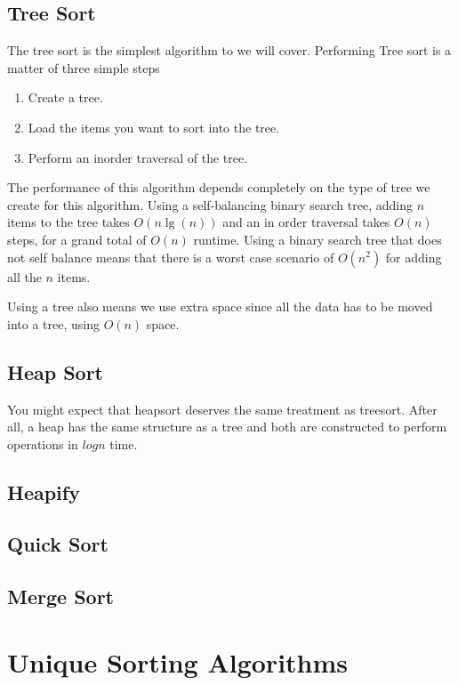 \documentclass[10pt,a4paper]{book}
\begin{document}
\subsection{Tree Sort}
The tree sort is the simplest algorithm to we will cover. Performing Tree sort is a matter of three simple steps

\begin{enumerate}
	\item Create a tree.
	\item Load the items you want to sort into the tree.
	\item Perform an inorder traversal of the tree.
\end{enumerate}


The performance of this algorithm depends completely on the type of tree we create for this algorithm.  Using a self-balancing binary search tree, adding $ n $ items to the tree takes $ O(n\lg(n)) $ and an in order traversal takes $ O(n) $ steps, for a grand total of $ O(n) $ runtime.  Using a binary search tree that does not self balance means that there is a worst case scenario of $ O(n^{2}) $ for adding all the $ n $ items.

Using a tree also means we use extra space since all the data has to be moved into a tree, using $ O(n) $ space.
\subsection{Heap Sort}
You might expect that heapsort deserves the same treatment as treesort.
After all, a heap has the same structure as a tree and both are constructed to perform operations in $log n $ time.

\subsection{Heapify}

\subsection{Quick Sort}
\subsection{Merge Sort}



\section{Unique Sorting Algorithms}
\end{document}
